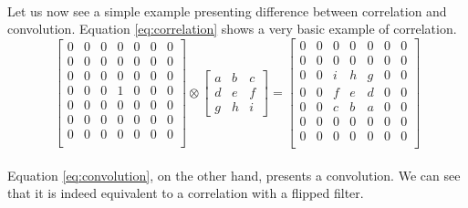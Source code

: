 \paragraph{}
Let us now see a simple example presenting difference between correlation and convolution. Equation \ref{eq:correlation} shows a very basic example of correlation.
\begin{equation}
\begin{bmatrix}
    0 & 0 & 0 & 0 & 0 & 0 & 0 \\
    0 & 0 & 0 & 0 & 0 & 0 & 0 \\
    0 & 0 & 0 & 0 & 0 & 0 & 0 \\
    0 & 0 & 0 & 1 & 0 & 0 & 0 \\
    0 & 0 & 0 & 0 & 0 & 0 & 0 \\
    0 & 0 & 0 & 0 & 0 & 0 & 0 \\
    0 & 0 & 0 & 0 & 0 & 0 & 0 \\            
\end{bmatrix}
\otimes
\begin{bmatrix}
    a & b & c \\
    d & e & f \\
    g & h & i
\end{bmatrix}
=
\begin{bmatrix}
    0 & 0 & 0 & 0 & 0 & 0 & 0 \\
    0 & 0 & 0 & 0 & 0 & 0 & 0 \\
    0 & 0 & i & h & g & 0 & 0 \\
    0 & 0 & f & e & d & 0 & 0 \\
    0 & 0 & c & b & a & 0 & 0 \\
    0 & 0 & 0 & 0 & 0 & 0 & 0 \\
    0 & 0 & 0 & 0 & 0 & 0 & 0 \\            
\end{bmatrix}
\label{eq:correlation}
\end{equation}

\paragraph{}
Equation \ref{eq:convolution}, on the other hand, presents a convolution. We can see that it is indeed equivalent to a correlation with a flipped filter.

